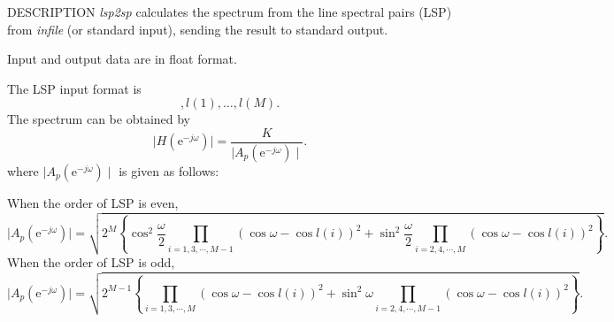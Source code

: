 \begin{synopsis}
\item[lsp2sp] [ --m $M$ ] [ --s $S$ ] [ --l $L$ ] [ --L ] [ --k ] [ --q $Q$ ] [ --o $O$ ] [ {\em infile} ]
\end{synopsis}

\begin{qsection}{DESCRIPTION}
{\em lsp2sp} calculates the spectrum from the line spectral pairs (LSP)
from {\em infile} (or standard input),
sending the result to standard output.

Input and output data are in float format.

The LSP input format is
 \begin{displaymath}
  [ K ], l(1), \dots, l(M).
 \end{displaymath}
The spectrum can be obtained by
  \begin{displaymath}
   \mid H(\mathrm{e}^{-j\omega}) \mid = \frac{K}{\mid A_p(\mathrm{e}^{-j\omega}) \mid}.
  \end{displaymath}
where $\mid A_p(\mathrm{e}^{-j\omega}) \mid$ is given as follows:

When the order of LSP is even, 
  \begin{displaymath}
   \mid A_p(\mathrm{e}^{-j\omega}) \mid = \sqrt{ 2^M \left\{ \cos^2 \frac{\omega}{2}\prod_{i=1,3,\cdots,M-1}(\cos \omega - \cos l(i))^2 + \sin^2 \frac{\omega}{2}\prod_{i=2,4,\cdots,M}(\cos \omega - \cos l(i))^2 \right\} }.
  \end{displaymath}
When the order of LSP is odd,
 \begin{displaymath}
  \mid A_p(\mathrm{e}^{-j\omega}) \mid = \sqrt{ 2^{M-1} \left\{ \prod_{i=1,3,\cdots,M}(\cos \omega - \cos l(i))^2 + \sin^2 \omega \prod_{i=2,4,\cdots,M-1}(\cos \omega - \cos l(i))^2 \right\} }.
 \end{displaymath}
\end{qsection}

